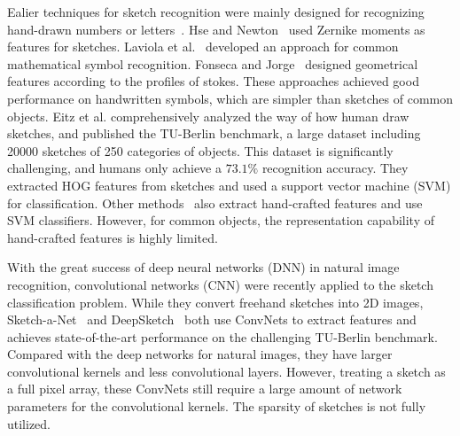 %
Ealier techniques for sketch recognition were mainly designed for recognizing hand-drawn numbers or letters~\cite{Hse2004SketchedSR, LaViola2004MathPad2AS, Fonseca2000UsingFL}.
Hse and Newton~\cite{Hse2004SketchedSR} used Zernike moments as features for sketches.
Laviola et al.~\cite{LaViola2004MathPad2AS} developed an approach for common mathematical symbol recognition.
Fonseca and Jorge~\cite{Fonseca2000UsingFL} designed geometrical features according to the profiles of stokes.
These approaches achieved good performance on handwritten symbols, which are simpler than sketches of common objects.
%
Eitz et al. \cite{Eitz2012HowDH} comprehensively analyzed the way of how human draw sketches, and published the TU-Berlin benchmark, a large dataset including 20000 sketches of 250 categories of objects. 
This dataset is significantly challenging, and humans only achieve a $73.1\%$ recognition accuracy.
%
They extracted HOG features from sketches and used a support vector machine (SVM) for classification.
Other methods~\cite{LiHSG15, Schneider2014SketchCA} also extract hand-crafted features and use SVM classifiers.
However, for common objects, the representation capability of hand-crafted features is highly limited.

 

With the great success of deep neural networks (DNN) in natural image recognition, convolutional networks (CNN) were recently applied to the sketch classification problem.
%
While they convert freehand sketches into 2D images, Sketch-a-Net~\cite{Yu2015SketchaNetTB} and DeepSketch~\cite{Seddati2015DeepSketchDC} both use ConvNets to extract features and achieves state-of-the-art performance on the challenging TU-Berlin benchmark.
%
Compared with the deep networks for natural images, they have larger convolutional kernels and less convolutional layers.
However, treating a sketch as a full pixel array, these ConvNets still require a large amount of network parameters for the convolutional kernels.
The sparsity of sketches is not fully utilized.


